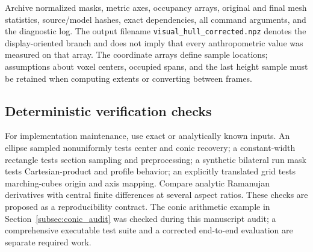 \documentclass[11pt,a4paper]{article}
\numberwithin{equation}{section}
\begin{document}
Archive normalized masks, metric axes, occupancy arrays, original and final mesh statistics, source/model hashes, exact dependencies, all command arguments, and the diagnostic log. The output filename \texttt{visual\_hull\_corrected.npz} denotes the display-oriented branch and does not imply that every anthropometric value was measured on that array. The coordinate arrays define sample locations; assumptions about voxel centers, occupied spans, and the last height sample must be retained when computing extents or converting between frames.

\subsection{Deterministic verification checks}
For implementation maintenance, use exact or analytically known inputs. An ellipse sampled nonuniformly tests center and conic recovery; a constant-width rectangle tests section sampling and preprocessing; a synthetic bilateral run mask tests Cartesian-product and profile behavior; an explicitly translated grid tests marching-cubes origin and axis mapping. Compare analytic Ramanujan derivatives with central finite differences at several aspect ratios. These checks are proposed as a reproducibility contract. The conic arithmetic example in Section~\ref{subsec:conic_audit} was checked during this manuscript audit; a comprehensive executable test suite and a corrected end-to-end evaluation are separate required work.
\end{document}
